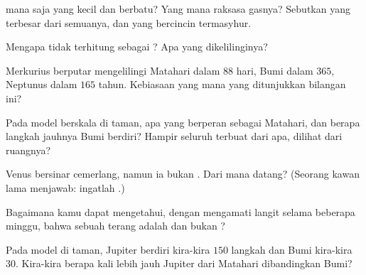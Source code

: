 \begin{exercise}[$\star$]\label{exo:g4:solar-system:3}
 mana saja yang kecil dan berbatu? Yang mana raksasa gasnya?
Sebutkan yang terbesar dari semuanya, dan yang bercincin termasyhur.
\end{exercise}

\begin{exercise}[$\star$]\label{exo:g4:solar-system:4}
Mengapa  tidak terhitung sebagai ? Apa yang dikelilinginya?
\end{exercise}

\begin{exercise}[$\star$]\label{exo:g4:solar-system:5}
Merkurius berputar mengelilingi Matahari dalam $88$ hari, Bumi dalam
$365$, Neptunus dalam $165$ tahun. Kebiasaan  yang mana yang
ditunjukkan bilangan ini?
\end{exercise}

\begin{exercise}[$\star$]\label{exo:g4:solar-system:6}
Pada model berskala di taman, apa yang berperan sebagai Matahari, dan
berapa langkah jauhnya Bumi berdiri? Hampir seluruh  terbuat
dari apa, dilihat dari ruangnya?
\end{exercise}

\begin{exercise}[$\star$]\label{exo:g4:solar-system:7}
Venus bersinar cemerlang, namun ia bukan . Dari mana 
datang? (Seorang kawan lama menjawab: ingatlah .)
\end{exercise}

\begin{exercise}[$\star$]\label{exo:g4:solar-system:8}
Bagaimana kamu dapat mengetahui, dengan mengamati langit selama
beberapa minggu, bahwa sebuah  terang adalah  dan bukan
?
\end{exercise}

\begin{exercise}[$\star$]\label{exo:g4:solar-system:9}
Pada model di taman, Jupiter berdiri kira-kira $150$ langkah dan Bumi
kira-kira $30$. Kira-kira berapa kali lebih jauh Jupiter dari Matahari
dibandingkan Bumi?
\end{exercise}

